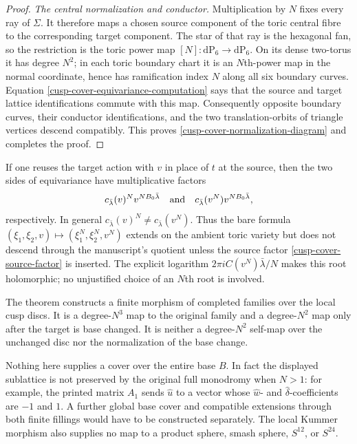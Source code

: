 \begin{proof}
\medskip\noindent
\emph{The central normalization and conductor.}
Multiplication by $N$ fixes every ray of $\Sigma$.  It therefore maps a
chosen source component of the toric central fibre to the corresponding
target component.  The star of that ray is the hexagonal fan, so the
restriction is the toric power map
$[N]\colon\mathrm{dP}_6\to\mathrm{dP}_6$.  On its dense two-torus it has
degree $N^2$; in each toric boundary chart it is an $N$th-power map in the
normal coordinate, hence has ramification index $N$ along all six boundary
curves.  Equation \eqref{cusp-cover-equivariance-computation} says that
the source and target lattice identifications commute with this map.
Consequently opposite boundary curves, their conductor identifications,
and the two translation-orbits of triangle vertices descend compatibly.
This proves \eqref{cusp-cover-normalization-diagram} and completes the
proof.
\end{proof}

\begin{remark}
\label{cusp-cover-naive-action-failure}
If one reuses the target action with $v$ in place of $t$ at the source,
then the two sides of equivariance have multiplicative factors
\[
 c_{\bar\lambda}(v)^N v^{NB_0\bar\lambda}
 \quad\hbox{and}\quad
 c_{\bar\lambda}(v^N)v^{NB_0\bar\lambda},
\]
respectively.  In general
$c_{\bar\lambda}(v)^N\ne c_{\bar\lambda}(v^N)$.  Thus the bare formula
$(\xi_1,\xi_2,v)\mapsto(\xi_1^N,\xi_2^N,v^N)$ extends on the ambient toric
variety but does not descend through the manuscript's quotient unless the
source factor \eqref{cusp-cover-source-factor} is inserted.  The explicit
logarithm $2\pi iC(v^N)\bar\lambda/N$ makes this root holomorphic; no
unjustified choice of an $N$th root is involved.
\end{remark}

\begin{remark}
\label{cusp-cover-global-scope}
The theorem constructs a finite morphism of completed families over the
local cusp discs.  It is a degree-$N^3$ map to the original family and a
degree-$N^2$ map only after the target is base changed.  It is neither a
degree-$N^2$ self-map over the unchanged disc nor the normalization of the
base change.

Nothing here supplies a cover over the entire base $B$.  In fact the
displayed sublattice is not preserved by the original full monodromy when
$N>1$: for example, the printed matrix $A_1$ sends
$\widehat u$ to a vector whose $\widehat w$- and
$\widehat\delta$-coefficients are $-1$ and $1$.  A further global base
cover and compatible extensions through both finite fillings would have
to be constructed separately.  The local Kummer morphism also supplies
no map to a product sphere, smash sphere, $S^{12}$, or $S^{24}$.
\end{remark}
